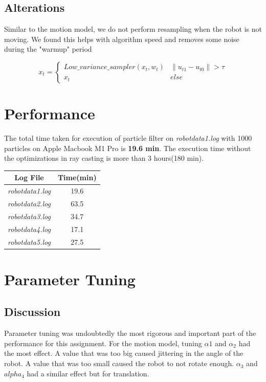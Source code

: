 \documentclass[12pt, a4paper]{article}
\begin{document}
\subsection{Alterations}
Similar to the motion model, we do not perform resampling when the robot is not moving. We found this helps with algorithm speed and removes some noise during the "warmup" period

\[ 
x_{t} = \left\{
\begin{array}{ll}
    Low\_variance\_sampler(x_{t}, w_{t}) & \lVert u_{t1} - u_{t0} \rVert > \tau \\
    x_{t} & else
\end{array} 
\right. 
\]

\section{Performance}
The total time taken for execution of particle filter on \textit{robotdata1.log} with 1000 particles on Apple Macbook M1 Pro is \textbf{19.6 min}. The execution time without the optimizations in ray casting is more than 3 hours(180 min).
\begin{center}
  \begin{tabular}{|c|c|}
    \hline
    \textbf{Log File} & \textbf{Time(min)} \\
    \hline
    \textit{robotdata1.log} & 19.6 \\
    \hline
    \textit{robotdata2.log} &  63.5\\
    \hline
    \textit{robotdata3.log} &  34.7\\
    \hline
    \textit{robotdata4.log} &  17.1\\
    \hline
    \textit{robotdata5.log} &  27.5\\
    \hline
  \end{tabular}
\end{center}
\section{Parameter Tuning}
\subsection{Discussion}
Parameter tuning was undoubtedly the most rigorous and important part of the performance for this assignment. For the motion model, tuning $\alpha1$ and $\alpha_2$ had the most effect. A value that was too big caused jittering in the angle of the robot. A value that was too small caused the robot to not rotate enough. $\alpha_3$ and $alpha_4$ had a similar effect but for translation.\\
\end{document}
